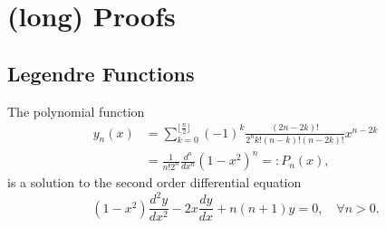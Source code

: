 \section{(long) Proofs}

\subsection{Legendre Functions} \label{kugel:sec:proofs:legendre}


\begin{lemma}
    The polynomial function
    \begin{align*}
        y_n(x)&=\sum_{k=0}^{\lfloor \frac{n}{2} \rfloor} (-1)^k \frac{(2n-2k)!}{2^n k! (n-k)!(n-2k)!} x^{n-2k}\\
        &= \frac{1}{n!2^n}\frac{d^n}{dx^n}(1-x^2)^n =: P_n(x),
    \end{align*}
    is a solution to the second order differential equation
    \begin{equation}\label{kugel:eq:sol_leg}
        (1-x^2)\frac{d^2y}{dx^2}-2x\frac{dy}{dx} + n(n+1)y=0, \quad \forall n>0.
    \end{equation}
\end{lemma}
